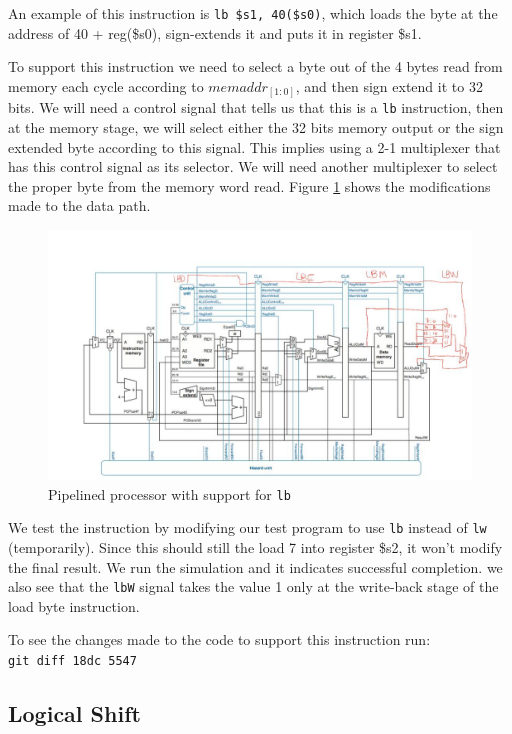 \documentclass[titlepage,12pt,oneside,a4paper]{article}
\newcommand{\code}[1]{{\texttt{#1}}}
\begin{document}
An example of this instruction is \code{lb \$s1, 40(\$s0)}, which loads the byte at the address of 40 + reg(\$s0), sign-extends it and puts it in register \$s1.

To support this instruction we need to select a byte out of the 4 bytes read from memory each cycle according to $memaddr_{[1:0]}$, and then sign extend it to 32 bits. We will need a control signal that tells us that this is a \code{lb} instruction, then at the memory stage, we will select either the 32 bits memory output or the sign extended byte according to this signal. This implies using a 2-1 multiplexer that has this control signal as its selector. We will need another multiplexer to select the proper byte from the memory word read. Figure \ref{fig:lb} shows the modifications made to the data path.

\begin{figure}
	\includegraphics[width=\textwidth]{lb.jpeg}
	\centering
	\caption{Pipelined processor with support for \code{lb}}
	\label{fig:lb}
\end{figure}

We test the instruction by modifying our test program to use \code{lb} instead of \code{lw} (temporarily). Since this should still the load 7 into register \$s2, it won't modify the final result. We run the simulation and it indicates successful completion. we also see that the \code{lbW} signal takes the value 1 only at the write-back stage of the load byte instruction.

To see the changes made to the code to support this instruction run:\\
\code{git diff 18dc 5547}

\subsection{Logical Shift}
\end{document}
